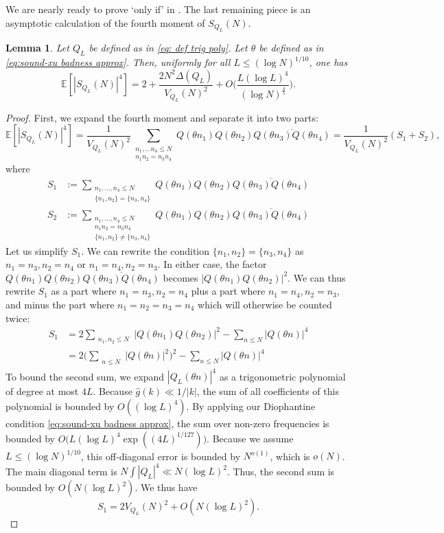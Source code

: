 \documentclass[12pt]{amsart}
\renewcommand{\le}{\leqslant}
\renewcommand{\leq}{\leqslant}
\numberwithin{equation}{section}
\theoremstyle{plain}
\newtheorem{lem}[thm]{Lemma}
\theoremstyle{definition}
\newcommand{\E}{\mathbb{E}}
\begin{document}
	We are nearly ready to prove `only if' in . The last remaining piece is an asymptotic calculation of the fourth moment of $S_{Q_L}(N)$.
	\begin{lem}\label{lem:fourth moment}
		Let $Q_L$ be defined as in \eqref{eq: def trig poly}. Let $\theta$ be defined as in \eqref{eq:sound-xu badness approx}. Then, uniformly for all $L \le (\log N)^{1/10}$, one has
		$$\E[|S_{Q_L}(N)|^4] = 2+\frac{2 N^2 \Delta(Q_L)}{V_{Q_L}(N)^2} + O\bigg( \frac{ L (\log L)^4}{(\log N)^{\frac{4}{5}}}  \bigg).$$
	\end{lem}
	\begin{proof}
		First, we expand the fourth moment and separate it into two parts: \begin{equation}\label{4th moment expansion s1 s2}
			\E[|S_{Q_L}(N)|^4] = \frac{1}{V_{Q_L}(N)^2}\sum_{\substack{n_1,\dots n_4 \leq N \\ n_1n_2=n_3n_4}}Q(\theta n_1)Q(\theta n_2)\overline{Q(\theta n_3)Q(\theta n_4)} = \frac{1}{V_{Q_L}(N)^2}(S_1+S_2),
		\end{equation}
		where
		\begin{align*}
			S_1 &:= \sum_{\substack{n_1,\dots ,n_4 \leq N \\ \{n_1,n_2\}=\{n_3,n_4\}}}Q(\theta n_1)Q(\theta n_2)\overline{Q(\theta n_3)Q(\theta n_4)}\\
			S_2 &:= \sum_{\substack{n_1,\dots ,n_4 \leq N \\ n_1n_2=n_3n_4 \\ \{n_1,n_2\}\ne\{n_3,n_4\}}}Q(\theta n_1)Q(\theta n_2)\overline{Q(\theta n_3)Q(\theta n_4)}
		\end{align*}
		Let us simplify $S_1$. We can rewrite the condition $\{n_1,n_2\}=\{n_3,n_4\}$ as $n_1=n_3,n_2=n_4$ or $n_1=n_4,n_2=n_3$. In either case, the factor $Q(\theta n_1)Q(\theta n_2)\overline{Q(\theta n_3)Q(\theta n_4)}$ becomes $|Q(\theta n_1)Q(\theta n_2)|^2$. We can thus rewrite $S_1$ as a part where $n_1=n_3,n_2=n_4$ plus a part where $n_1=n_4,n_2=n_3$, and minus the part where $n_1=n_2=n_3=n_4$ which will otherwise be counted twice:
		\begin{align*}
			S_1 &= 2\sum_{\substack{n_1,n_2 \leq N}}|Q(\theta n_1)Q(\theta n_2)|^2 - \sum_{n \leq N}|Q(\theta n)|^4 \\ 
			&= 2\bigg(\sum_{\substack{n \leq N}}|Q(\theta n)|^2\bigg)^2 - \sum_{n \leq N}|Q(\theta n)|^4
		\end{align*}
		To bound the second sum, we expand $|Q_L(\theta n)|^4$ as a trigonometric polynomial of degree at most $4L$. Because $\hat{g}(k) \ll 1/|k|$, the sum of all coefficients of this polynomial is bounded by $O((\log L)^4)$. By applying our Diophantine condition \eqref{eq:sound-xu badness approx}, the sum over non-zero frequencies is bounded by $O\big(L (\log L)^4 \exp((4L)^{1/127})\big)$. Because we assume $L \le (\log N)^{1/10}$, this off-diagonal error is bounded by $N^{o(1)}$, which is $o(N)$. The main diagonal term is $N \int |Q_L|^4 \ll N (\log L)^2$. Thus, the second sum is bounded by $O(N(\log L)^2)$. We thus have
		$$S_1 = 2V_{Q_L}(N)^2 +O(N (\log L)^2).$$
		

\end{proof}
\end{document}
